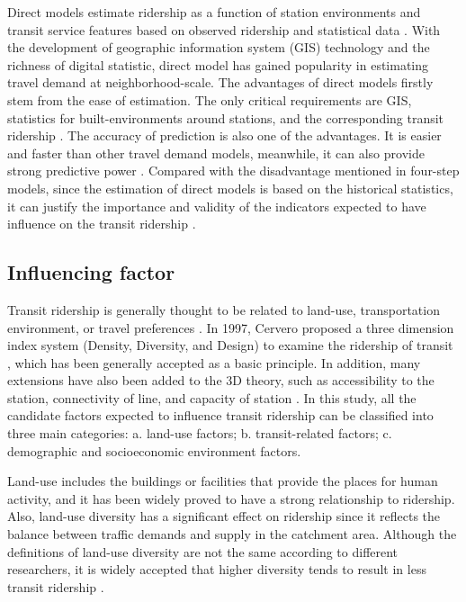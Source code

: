 Direct models estimate ridership as a function of station environments and transit service features based on observed ridership and statistical data \cite{cervero2006alternative}. With the development of geographic information system (GIS) technology and the richness of digital statistic, direct model has gained popularity in estimating travel demand at neighborhood-scale. The advantages of direct models firstly stem from the ease of estimation. The only critical requirements are GIS, statistics for built-environments around stations, and the corresponding transit ridership \cite{guerra2012half}. The accuracy of prediction is also one of the advantages. It is easier and faster than other travel demand models, meanwhile, it can also provide strong predictive power \cite{lane2006sketch}. Compared with the disadvantage mentioned in four-step models, since the estimation of direct models is based on the historical statistics, it can justify the importance and validity of the indicators expected to have influence on the transit ridership \cite{walters2003forecasting}.

%
\subsection{Influencing factor}
Transit ridership is generally thought to be related to land-use, transportation environment, or travel preferences \cite{thompson1997achieving}. In 1997, Cervero proposed a three dimension index system (Density, Diversity, and Design) to examine the ridership of transit \cite{cervero1997travel}, which has been generally accepted as a basic principle. In addition, many extensions have also been added to the 3D theory, such as accessibility to the station, connectivity of line, and capacity of station \cite{beimborn2003accessibility,garcia2013walking}. In this study, all the candidate factors expected to influence transit ridership can be classified into three main categories: a. land-use factors; b. transit-related factors; c. demographic and socioeconomic environment factors.

Land-use includes the buildings or facilities that provide the places for human activity, and it has been widely proved to have a strong relationship to ridership. Also, land-use diversity has a significant effect on ridership since it reflects the balance between traffic demands and supply in the catchment area. Although the definitions of land-use diversity are not the same according to different researchers, it is widely accepted that higher diversity tends to result in less transit ridership \cite{cardozo2012application,choi2012analysis,gutierrez2011transit,jun2015land,sohn2010factors,sung2014exploring}.

